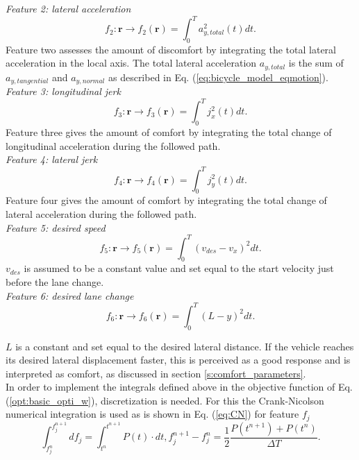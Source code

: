 \textit{Feature 2: lateral acceleration}
\begin{equation}\label{eq:flat_acc}
f_{2}:\bm{r}\xrightarrow{}f_2(\bm{r})=\int_{0}^{T}a_{y,total}^{2}(t) dt.
\end{equation}
Feature two assesses the amount of discomfort by integrating the total lateral acceleration in the local axis. The total lateral acceleration  $a_{y,total} $ is the sum of  $ a_{y,tangential}$ and $a_{y,normal}$ as described in Eq. (\ref{eq:bicycle_model_eqmotion}).\\

\textit{Feature 3: longitudinal jerk}
\begin{equation}\label{eq:flong_jerk}
f_{3}:\bm{r}\xrightarrow{}f_3(\bm{r})=\int_{0}^{T}j_{x}^{2}(t) dt.
\end{equation}
Feature three gives the amount of comfort by integrating the total change of longitudinal acceleration during the followed path. \\

\textit{Feature 4: lateral jerk}
\begin{equation}\label{eq:flat_jerk}
f_{4}:\bm{r}\xrightarrow{}f_4(\bm{r})=\int_{0}^{T}j_y^{2}(t) dt.
\end{equation}
Feature four gives the amount of comfort by integrating the total change of lateral acceleration during the followed path. \\

\textit{Feature 5: desired speed}
\begin{equation}\label{eq:des_speed}
f_{5}:\bm{r}\xrightarrow{}f_5(\bm{r})=\int_{0}^{T}(v_{des}-v_x)^2 dt.
\end{equation}
$v_{des}$ is assumed to be a constant value and set equal to the start velocity just before the lane change.\\

\textit{Feature 6: desired lane change}
\begin{equation}\label{eq:des_lane_change}
f_{6}:\bm{r}\xrightarrow{}f_6(\bm{r})=\int_{0}^{T}(L-y)^2 dt.
\end{equation}

$L$ is a constant and set equal to the desired lateral distance. If the vehicle reaches its desired lateral displacement faster, this is perceived as a good response and is interpreted as comfort, as discussed in section \ref{s:comfort_parameters}.\\

In order to implement the integrals defined above in the objective function of Eq. (\ref{opt:basic_opti_w}), discretization is needed. For this the Crank-Nicolson numerical integration is used as is shown in Eq. (\ref{eq:CN}) for feature $f_j$
\begin{subequations}\label{eq:CN}
	\begin{equation}
	\int_{f_j^n}^{f_j^{n+1}}df_j=\int_{t^n}^{t^{n+1}} P(t) \cdot dt,
	\end{equation}
	\begin{equation}
	f_j^{n+1} -f_j^{n} = \frac{1}{2}\frac{P(t^{n+1})+P(t^n)}{\Delta T}.
	\end{equation}
\end{subequations}\\

